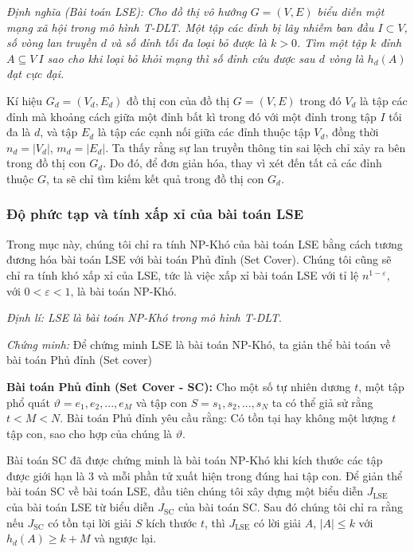  	{\itshape Định nghĩa (Bài toán LSE): Cho đồ thị vô hướng $G=(V,E)$ biểu diễn một mạng xã hội trong mô hình T-DLT. Một tập các đỉnh bị lây nhiễm ban đầu $I \subset V$, số vòng lan truyền $d$ và số đỉnh tối đa loại bỏ được là $k > 0$. Tìm một tập $k$ đỉnh  $A \subseteq V \ I$ sao cho khi loại bỏ khỏi mạng thì số đỉnh cứu được sau $d$ vòng là $h_{d}(A)$ đạt cực đại.}
 	
 	Kí hiệu $G_{d} = (V_{d}, E_{d})$ đồ thị con của đồ thị $G=(V, E)$ trong đó $V_{d}$ là tập các đỉnh mà khoảng cách giữa một đỉnh bất kì trong đó với một đỉnh trong tập $I$ tối đa là $d$, và tập $E_{d}$ là tập các cạnh nối giữa các đỉnh thuộc tập $V_{d}$, đồng thời $n_{d} = | V_{d} |$, $m_{d} = | E_{d} |$. Ta thấy rằng sự lan truyền thông tin sai lệch chỉ xảy ra bên trong đồ thị con $G_{d}$. Do đó, để đơn giản hóa, thay vì xét đến tất cả các đỉnh thuộc $G$, ta sẽ chỉ tìm kiếm kết quả trong đồ thị con $G_{d}$.
 	
 	\subsubsection{Độ phức tạp và tính xấp xỉ của bài toán LSE}
 	Trong mục này, chúng tôi chỉ ra tính NP-Khó của bài toán LSE bằng cách tương đương hóa bài toán LSE với bài toán Phủ đỉnh (Set Cover). Chúng tôi cũng sẽ chỉ ra tính khó xấp xỉ của LSE, tức là việc xấp xỉ bài toán LSE với tỉ lệ $n^{1 - \varepsilon}$, với $0 < \varepsilon < 1$, là bài toán NP-Khó.
 	
 	{\itshape Định lí: LSE là bài toán NP-Khó trong mô hình T-DLT}.
 	
 	{\itshape Chứng minh:} Để chứng minh LSE là bài toán NP-Khó, ta giản thể bài toán về bài toán Phủ đỉnh (Set cover) 
 	
 	{\bfseries Bài toán Phủ đỉnh (Set Cover - SC):} Cho một số tự nhiên dương $t$, một tập phổ quát $\vartheta = {e_{1}, e_{2}, ... ,e_{M}}$ và tập con $S = {s_{1}, s_{2}, ... , s_{N}}$ ta có thể giả sử rằng $t < M < N$. Bài toán Phủ đỉnh yêu cầu rằng: Có tồn tại hay không một lượng $t$ tập con, sao cho hợp của chúng là $\vartheta$.
 	
 	Bài toán SC đã được chứng minh là bài toán NP-Khó khi kích thước các tập được giới hạn là 3 và mỗi phần tử xuất hiện trong đúng hai tập con. Để giản thể bài toán SC về bài toán LSE, đầu tiên chúng tôi xây dựng một biểu diễn $J_{\text{LSE}}$ của bài toán LSE từ biểu diễn $J_{\text{SC}}$ của bài toán SC. Sau đó chúng tôi chỉ ra rằng nếu $J_{\text{SC}}$ có tồn tại lời giải $S$ kích thước $t$, thì $J_{\text{LSE}}$ có lời giải $A$, $| A | \leq k$ với $h_{d}(A) \geq k + M$ và ngược lại.
 	
